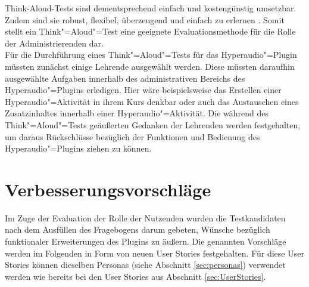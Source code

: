 Think-Aloud-Tests sind dementsprechend einfach und kostengünstig umsetzbar. Zudem sind sie robust, flexibel, überzeugend und einfach zu erlernen \citep{nielsen2012thinking}. Somit stellt ein Think"=Aloud"=Test eine geeignete Evaluationsmethode für die Rolle der Administrierenden dar.\\
Für die Durchführung eines Think"=Aloud"=Tests für das Hyperaudio"=Plugin müssten zunächst einige Lehrende ausgewählt werden. Diese müssten daraufhin ausgewählte Aufgaben innerhalb des administrativen Bereichs des Hyperaudio"=Plugins erledigen. Hier wäre beispielsweise das Erstellen einer Hyperaudio"=Aktivität in ihrem Kurs denkbar oder auch das Austauschen eines Zusatzinhaltes innerhalb einer Hyperaudio"=Aktivität. Die während des Think"=Aloud"=Tests geäußerten Gedanken der Lehrenden werden festgehalten, um daraus Rückschlüsse bezüglich der Funktionen und Bedienung des Hyperaudio"=Plugins ziehen zu können.






\section{Verbesserungsvorschläge}
\label{sec:Verbesserungsvorschlaege}
Im Zuge der Evaluation der Rolle der Nutzenden wurden die Testkandidaten nach dem Ausfüllen des Fragebogens darum gebeten, Wünsche bezüglich funktionaler Erweiterungen des Plugins zu äußern. Die genannten Vorschläge werden im Folgenden in Form von neuen User Stories festgehalten. Für diese User Stories können dieselben Personas (siehe Abschnitt \ref{sec:personas}) verwendet werden wie bereits bei den User Stories aus Abschnitt \ref{sec:UserStories}.

